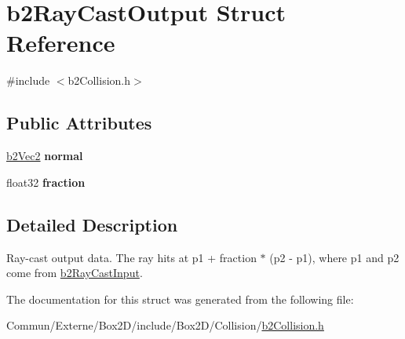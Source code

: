 \hypertarget{structb2_ray_cast_output}{}\section{b2\+Ray\+Cast\+Output Struct Reference}
\label{structb2_ray_cast_output}


{\ttfamily \#include $<$b2\+Collision.\+h$>$}

\subsection*{Public Attributes}
\begin{DoxyCompactItemize}
\item 
\hyperlink{structb2_vec2}{b2\+Vec2} {\bfseries normal}\hypertarget{structb2_ray_cast_output_aa9bbfe75afa23c21e85cb1bd3736529b}{}\label{structb2_ray_cast_output_aa9bbfe75afa23c21e85cb1bd3736529b}

\item 
float32 {\bfseries fraction}\hypertarget{structb2_ray_cast_output_a191c69bb399304bfe30c69e2158b3f29}{}\label{structb2_ray_cast_output_a191c69bb399304bfe30c69e2158b3f29}

\end{DoxyCompactItemize}


\subsection{Detailed Description}
Ray-\/cast output data. The ray hits at p1 + fraction $\ast$ (p2 -\/ p1), where p1 and p2 come from \hyperlink{structb2_ray_cast_input}{b2\+Ray\+Cast\+Input}. 

The documentation for this struct was generated from the following file\+:\begin{DoxyCompactItemize}
\item 
Commun/\+Externe/\+Box2\+D/include/\+Box2\+D/\+Collision/\hyperlink{b2_collision_8h}{b2\+Collision.\+h}\end{DoxyCompactItemize}

